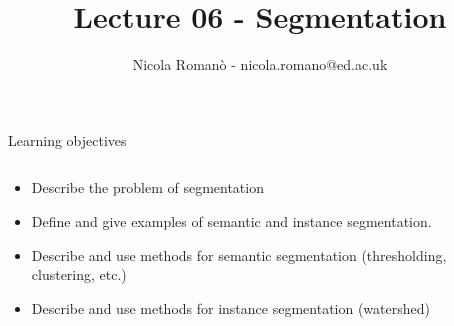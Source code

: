 \documentclass[9pt, aspectratio=169]{beamer}
\author{Nicola Roman\`o - nicola.romano@ed.ac.uk}
\title{Lecture 06 - Segmentation}
\date{}
\begin{document}

\begin{frame}
    \titlepage
\end{frame}

\begin{frame}
    {Learning objectives}
    \begin{columns}
        \begin{column}{0.8\textwidth}
            \begin{itemize}
                \item Describe the problem of segmentation
                \item Define and give examples of semantic and instance segmentation.
                \item Describe and use methods for semantic segmentation (thresholding, clustering, etc.)
                \item Describe and use methods for instance segmentation (watershed)
            \end{itemize}
        \end{column}
        \begin{column}{0.2\textwidth}

\end{column}
\end{columns}
\end{frame}
\end{document}
